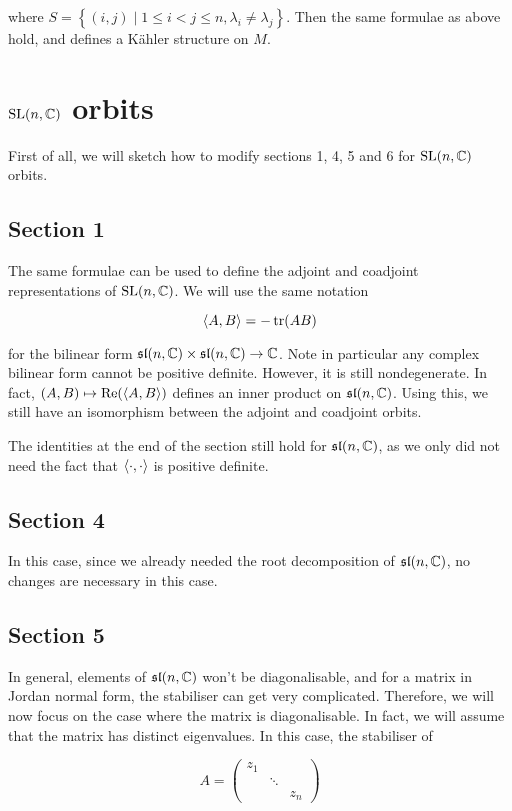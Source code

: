 \documentclass{article}
\renewcommand{\sl}{\mathfrak{sl}}
\begin{document}
where \(S = \left\{(i, j) \mid 1 \le i < j \le n, \lambda_i \ne \lambda_j\right\}\). Then the same formulae as above hold, and defines a K\"ahler structure on \(M\). 

\section{\(\operatorname{SL}(n, \mathbb{C})\) orbits}

First of all, we will sketch how to modify sections 1, 4, 5 and 6 for \(\operatorname{SL}(n, \mathbb{C})\) orbits.

\subsection*{Section 1}

The same formulae can be used to define the adjoint and coadjoint representations of \(\operatorname{SL}(n, \mathbb{C})\). We will use the same notation

\[\left\langle A, B \right\rangle = -\tr(AB)\]

for the bilinear form \(\sl(n, \C) \times \sl(n, \C) \to \C\). Note in particular any complex bilinear form cannot be positive definite. However, it is still nondegenerate. In fact, \((A, B) \mapsto \Re(\left\langle A, B \right\rangle)\) defines an inner product on \(\sl(n, \C)\). Using this, we still have an isomorphism between the adjoint and coadjoint orbits.

The identities at the end of the section still hold for \(\sl(n, \C)\), as we only did not need the fact that \(\left\langle \cdot, \cdot \right\rangle\) is positive definite.

\subsection*{Section 4}

In this case, since we already needed the root decomposition of \(\sl(n, \C)\), no changes are necessary in this case.

\subsection*{Section 5}

In general, elements of \(\sl(n, \C)\) won't be diagonalisable, and for a matrix in Jordan normal form, the stabiliser can get very complicated. Therefore, we will now focus on the case where the matrix is diagonalisable. In fact, we will assume that the matrix has distinct eigenvalues. In this case, the stabiliser of

\[A = \begin{pmatrix}
    z_1 \\
    & \ddots \\
    & & z_n
\end{pmatrix}\]
\end{document}
